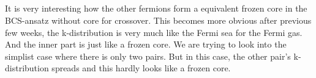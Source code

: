 \subsection{}
It is very interesting how the other fermions form a equivalent frozen core in the BCS-ansatz without core for crossover.  This becomes more obvious after previous few weeks, the k-distribution is very much like the Fermi sea for the Fermi gas.  And the inner part is just like a frozen core.  We are trying to look into the simplist case where there is only two pairs. But in this case, the other pair's k-distribution spreads and this hardly looks like a frozen core.  